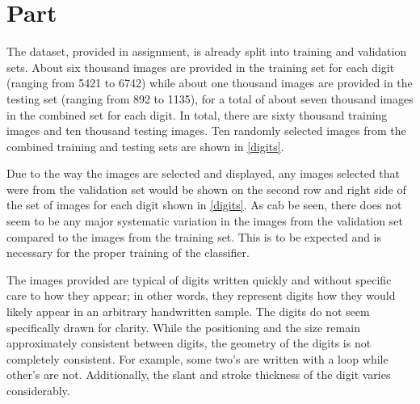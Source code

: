 \documentclass{article}
\newcommand{\enterproblemHeader}[1]{
}
\newcommand{\exitproblemHeader}[1]{
}
\newcounter{problem} %
\newcommand{\problemName}{}
\newenvironment{problem}[1][Part \theproblem]{ %
	\stepcounter{problem} %
	\renewcommand{\problemName}{#1} %
	\section{\problemName} %
	\enterproblemHeader{\problemName} %
}{
	\exitproblemHeader{\problemName} %
}
\begin{document}
\FloatBarrier
\begin{problem}
	The dataset, provided in assignment, is already split into training and validation sets. About six thousand images are provided in the training set for each digit (ranging from 5421 to 6742) while about one thousand images are provided in the testing set (ranging from 892 to 1135), for a total of about seven thousand images in the combined set for each digit. In total, there are sixty thousand training images and ten thousand testing images. Ten randomly selected images from the combined training and testing sets are shown in \cref{digits}.
	
	Due to the way the images are selected and displayed, any images selected that were from the validation set would be shown on the second row and right side of the set of images for each digit shown in \cref{digits}. As cab be seen, there does not seem to be any major systematic variation in the images from the validation set compared to the images from the training set. This is to be expected and is necessary for the proper training of the classifier.
	
	The images provided are typical of digits written quickly and without specific care to how they appear; in other words, they represent digits how they would likely appear in an arbitrary handwritten sample. The digits do not seem specifically drawn for clarity. While the positioning and the size remain approximately consistent between digits, the geometry of the digits is not completely consistent. For example, some two's are written with a loop while other's are not. Additionally, the slant and stroke thickness of the digit varies considerably.
	

\end{problem}
\end{document}
